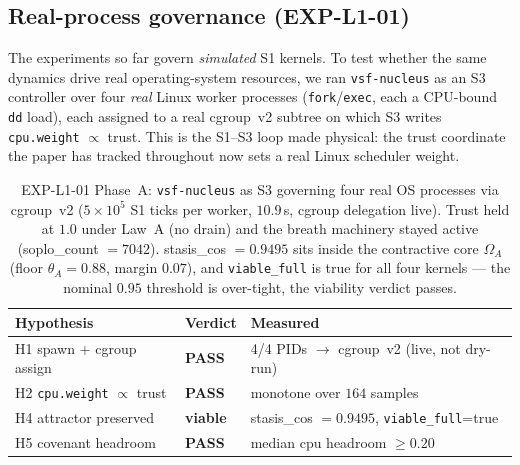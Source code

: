 \documentclass[11pt, a4paper]{article}
\newcommand{\nucleus}{\texttt{vsf-nucleus}}
\begin{document}
\subsection{Real-process governance (EXP-L1-01)}
\label{sec:real_proc_gov}

The experiments so far govern \emph{simulated} S1 kernels. To test whether the
same dynamics drive real operating-system resources, we ran \nucleus{} as an S3
controller over four \emph{real} Linux worker processes
(\texttt{fork}/\texttt{exec}, each a CPU-bound \texttt{dd} load), each assigned to
a real cgroup~v2 subtree on which S3 writes \texttt{cpu.weight} $\propto$ trust.
This is the S1--S3 loop made physical: the trust coordinate the paper has tracked
throughout now sets a real Linux scheduler weight.

\begin{table}[!htb]
\centering
\begin{tabular}{lll}
\toprule
Hypothesis & Verdict & Measured \\
\midrule
H1 spawn + cgroup assign        & \textbf{PASS}   & 4/4 PIDs $\to$ cgroup~v2 (live, not dry-run) \\
H2 \texttt{cpu.weight} $\propto$ trust & \textbf{PASS}   & monotone over $164$ samples \\
H4 attractor preserved          & \textbf{viable} & stasis\_cos $=0.9495$, \texttt{viable\_full}=true \\
H5 covenant headroom            & \textbf{PASS}   & median cpu headroom $\geq 0.20$ \\
\bottomrule
\end{tabular}
\caption{EXP-L1-01 Phase~A: \nucleus{} as S3 governing four real OS processes via
cgroup~v2 ($5\times10^5$ S1 ticks per worker, $10.9$\,s, cgroup delegation live).
Trust held at $1.0$ under Law~A (no drain) and the breath machinery stayed active
(soplo\_count $=7042$).  stasis\_cos $=0.9495$ sits inside the contractive core
$\Omega_A$ (floor $\theta_A = 0.88$, margin $0.07$), and \texttt{viable\_full} is
true for all four kernels --- the nominal $0.95$ threshold is over-tight, the
viability verdict passes.}
\label{tab:realgov}
\end{table}
\end{document}
